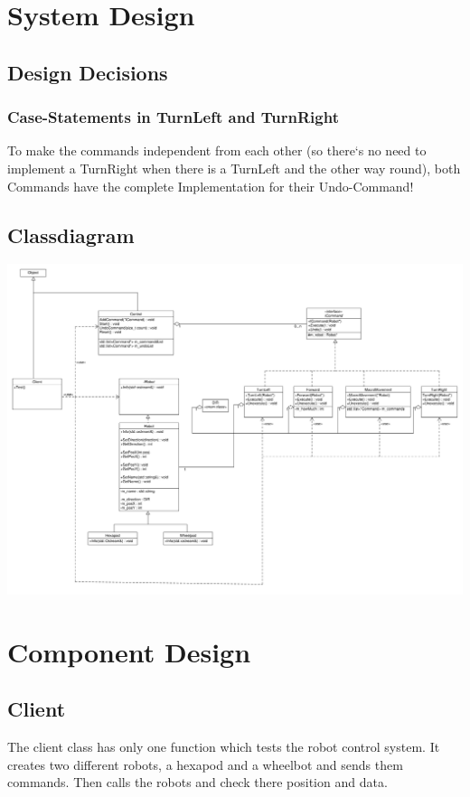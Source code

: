 \section{System Design}
\subsection{Design Decisions}
\subsubsection{Case-Statements in TurnLeft and TurnRight}
To make the commands independent from each other (so there`s no need to implement a TurnRight when there is a TurnLeft and the other way round), both Commands have the complete Implementation for their Undo-Command!

\newpage
\subsection{Classdiagram}
\includegraphics[scale=0.35, angle=90]{../ClassDiagram.pdf}

\section{Component Design}
\subsection{Client}
The client class has only one function which tests the robot control system. It creates two different robots, a hexapod and a wheelbot and sends them commands.
Then calls the robots and check there position and data.

